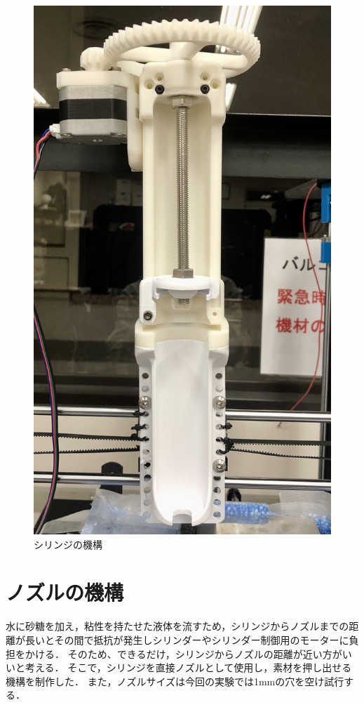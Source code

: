\begin{figure}[H]
  \centering
  \includegraphics[width=7truecm]{./fig/101285897.jpg}
  \caption{シリンジの機構}
  \label{fig:printer2}
\end{figure}

\section{ノズルの機構}
\label{sec:paragraph}
水に砂糖を加え，粘性を持たせた液体を流すため，シリンジからノズルまでの距離が長いとその間で抵抗が発生しシリンダーやシリンダー制御用のモーターに負担をかける．
そのため、できるだけ，シリンジからノズルの距離が近い方がいいと考える．
そこで，シリンジを直接ノズルとして使用し，素材を押し出せる機構を制作した．
また，ノズルサイズは今回の実験では1mmの穴を空け試行する．

